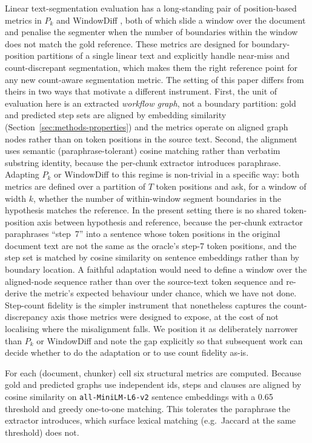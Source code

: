 \documentclass[make,article,submit,oneauthor,pdftex]{Definitions/mdpi}
\begin{document}
Linear text-segmentation evaluation has a long-standing pair of
position-based metrics in $P_k$ \cite{beeferman1999statistical} and
WindowDiff \cite{pevzner2002critique}, both of which slide a window
over the document and penalise the segmenter when the number of
boundaries within the window does not match the gold reference. These
metrics are designed for boundary-position partitions of a single
linear text and explicitly handle near-miss and count-discrepant
segmentation, which makes them the right reference point for any new
count-aware segmentation metric. The setting of this paper differs
from theirs in two ways that motivate a different instrument. First,
the unit of evaluation here is an extracted \emph{workflow graph}, not
a boundary partition: gold and predicted step sets are aligned by
embedding similarity (Section~\ref{sec:methods-properties}) and the
metrics operate on aligned graph nodes rather than on token positions
in the source text. Second, the alignment uses semantic
(paraphrase-tolerant) cosine matching rather than verbatim
substring identity, because the per-chunk extractor introduces
paraphrase. Adapting $P_k$ or WindowDiff to this regime is non-trivial in a
specific way: both metrics are defined over a partition of $T$ token
positions and ask, for a window of width $k$, whether the number of
within-window segment boundaries in the hypothesis matches the
reference. In the present setting there is no shared token-position
axis between hypothesis and reference, because the per-chunk extractor
paraphrases ``step~7'' into a sentence whose token positions in the
original document text are not the same as the oracle's step-7 token
positions, and the step set is matched by cosine similarity on
sentence embeddings rather than by boundary location. A faithful
adaptation would need to define a window over the aligned-node
sequence rather than over the source-text token sequence and re-derive
the metric's expected behaviour under chance, which we have not done.
Step-count fidelity is the simpler instrument that nonetheless
captures the count-discrepancy axis those metrics were designed to
expose, at the cost of not localising where the misalignment falls.
We position it as deliberately narrower than $P_k$ or WindowDiff and
note the gap explicitly so that subsequent work can decide whether to
do the adaptation or to use count fidelity as-is.

For each (document, chunker) cell six structural metrics are
computed. Because gold and predicted graphs use independent ids,
steps and clauses are aligned by cosine similarity on
\texttt{all-MiniLM-L6-v2} sentence embeddings with a 0.65 threshold
and greedy one-to-one matching. This
tolerates the paraphrase the extractor introduces, which surface
lexical matching (e.g.\ Jaccard at the same threshold) does not.
\end{document}
